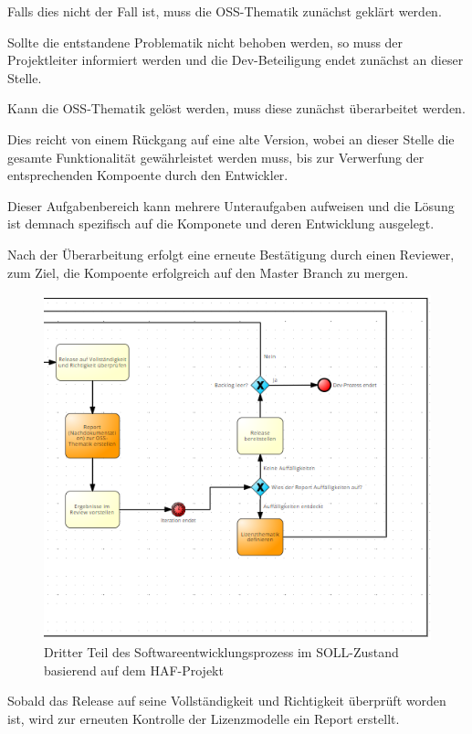 Falls dies nicht der Fall ist, muss die OSS-Thematik zunächst geklärt werden.

Sollte die entstandene Problematik nicht behoben werden, so muss der Projektleiter informiert werden und die Dev-Beteiligung endet zunächst an dieser Stelle. 

Kann die OSS-Thematik gelöst werden, muss diese zunächst überarbeitet werden. 

Dies reicht von einem Rückgang auf eine alte Version, wobei an dieser Stelle die gesamte Funktionalität gewährleistet werden muss, bis zur Verwerfung der entsprechenden Kompoente durch den Entwickler. 

Dieser Aufgabenbereich kann mehrere Unteraufgaben aufweisen und die Lösung ist demnach spezifisch auf die Komponete und deren Entwicklung ausgelegt. 

Nach der Überarbeitung erfolgt eine erneute Bestätigung durch einen Reviewer, zum Ziel, die Kompoente erfolgreich auf den Master Branch zu mergen. 

\begin{figure}[h]
    \centering
    \includegraphics[scale=0.8]{Bilder/SOLL-Prozess_third Part.png}
    \caption{Dritter Teil des Softwareentwicklungsprozess im SOLL-Zustand basierend auf dem HAF-Projekt}
\end{figure}

Sobald das Release auf seine Vollständigkeit und Richtigkeit überprüft worden ist, wird zur erneuten Kontrolle der Lizenzmodelle ein Report erstellt. 

